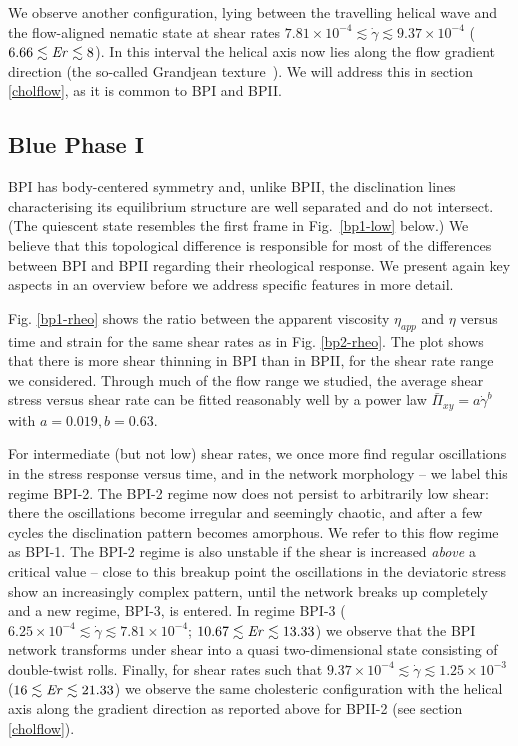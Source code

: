 \documentclass[aps,pre,reprint,superscriptaddress, twocolumn]{revtex4}
\newcommand{\e}[1]{\times10^{#1}}
\newcommand{\gd}{\dot{\gamma}}
\begin{document}
We observe another configuration, lying between the travelling helical wave 
and the  flow-aligned nematic state at shear rates 
$7.81\e{-4}\lesssim\gd\lesssim9.37\e{-4}$ ($6.66\lesssim {\it Er} \lesssim 8$). In this interval
the helical axis now lies along the flow gradient direction (the so-called
Grandjean texture~\cite{deGennes}).
We will address this in section \ref{cholflow}, as it is common to BPI and BPII.

\subsection{Blue Phase I}

BPI has body-centered symmetry and, unlike BPII, the disclination lines
characterising its equilibrium structure are well separated and do not 
intersect. (The quiescent state resembles the first frame in Fig.~\ref{bp1-low}
below.)
We believe that this topological difference is responsible for most of
the differences between BPI and BPII regarding their rheological response. 
We present again key aspects in an overview before we address specific features 
in more detail. 

Fig. \ref{bp1-rheo} shows the ratio between the 
apparent viscosity $\eta_{app}$ and $\eta$ versus time and 
strain for the same shear rates as in Fig. \ref{bp2-rheo}. The plot
shows that there is more shear thinning in BPI than in BPII, for
the shear rate range we considered. 
Through much of the flow range we studied,
the average shear stress versus shear rate can be fitted reasonably 
well by a power law $\bar{\Pi}_{xy}=a \gd^b$ with $a=0.019, b=0.63$.

For intermediate (but not low) shear rates, we once more find regular oscillations in the stress
response versus time, and in the network morphology -- we label this 
regime BPI-2. 
The BPI-2 regime now does not persist to arbitrarily low shear: there the
oscillations become irregular and seemingly chaotic, and after a few
cycles the disclination pattern becomes amorphous. We refer to this 
flow regime as BPI-1. 
The BPI-2 regime is also unstable if the shear is increased {\em above} 
a critical value -- close to this breakup point the oscillations in the 
deviatoric stress show an increasingly complex
pattern, until the network breaks up completely and a new regime, BPI-3, is entered.
In regime BPI-3 ($6.25\e{-4}\lesssim\gd\lesssim7.81\e{-4}$; $10.67 \lesssim {\it Er} \lesssim 13.33$) 
we observe that the BPI network transforms under shear into
a  quasi two-dimensional state consisting of
double-twist rolls.
Finally, for shear rates such that
$9.37\e{-4}\lesssim\gd\lesssim1.25\e{-3}$ ($16 \lesssim {\it Er} \lesssim 21.33$) we observe the same cholesteric 
configuration with the helical axis along the gradient direction as 
reported above for BPII-2 (see
section \ref{cholflow}).
 
\end{document}
